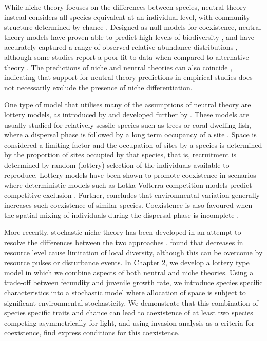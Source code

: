  While niche theory focuses on the differences between species, neutral theory instead considers all species equivalent at an individual level, with community structure determined by chance \citep[e.g.][]{hubbell1979tree,chave2004neutral,hubbell2001unified}. Designed as null models for coexistence, neutral theory models have proven able to predict high levels of biodiversity \citep[see ][ and references therein]{chave2004neutral,hubbell2001unified}, and have accurately captured a range of observed relative abundance distributions \citep[e.g.][]{volkov2003neutral}, although some studies report a poor fit to data when compared to alternative theory \citep[e.g.][]{dornelas2006coral,mcgill2006empirical}. The predictions of niche and neutral theories can also coincide \citep{chisholm2010niche}, indicating that support for neutral theory predictions in empirical studies does not necessarily exclude the presence of niche differentiation.
 
One type of model that utilises many of the assumptions of neutral theory are lottery models, as introduced by \cite{sale1978coexistence} and developed further by \cite{chesson1981environmental}. These models are usually studied for relatively sessile species such as trees or coral dwelling fish, where a dispersal phase is followed by a long term occupancy of a site \citep[e.g.][]{munday2004competitive}. Space is considered a limiting factor and the occupation of sites by a species is determined by the proportion of sites occupied by that species, that is, recruitment is determined by random (lottery) selection of the individuals available to reproduce. Lottery models have been shown to promote coexistence in scenarios where deterministic models such as Lotka-Volterra competition models predict competitive exclusion \citep[e.g.][]{chesson2000mechanisms}. Further, \cite{fagerstrom1988lotteries} concludes that environmental variation generally increases such coexistence of similar species. Coexistence is also favoured when the spatial mixing of individuals during the dispersal phase is incomplete \citep{muko2003incomplete,snyder2003local}.

More recently, stochastic niche theory has been developed in an attempt to resolve the differences between the two approaches \citep{tilman2004niche}. \cite{tilman2004niche} found that decreases in resource level cause limitation of local diversity, although this can be overcome by resource pulses or disturbance events. In Chapter 2, we develop a lottery type model in which we combine aspects of both neutral and niche theories. Using a trade-off between fecundity and juvenile growth rate, we introduce species specific characteristics into a stochastic model where  allocation of space is subject to significant environmental stochasticity. We demonstrate that this combination of species specific traits and chance can lead to coexistence of at least two species competing asymmetrically for light, and using invasion analysis as a criteria for coexistence, find express conditions for this coexistence. 

